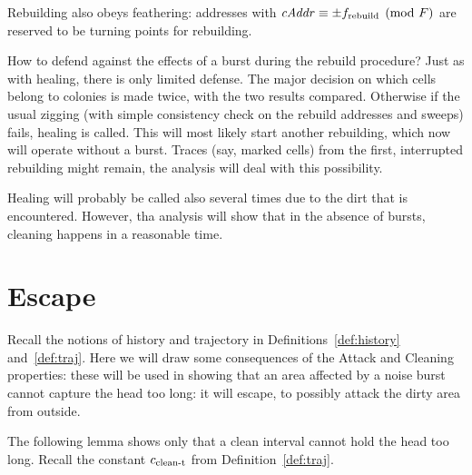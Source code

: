 \documentclass[12pt]{memoir}
\newcommand{\fld}[1]{\ensuremath{\textit{#1\/}}}
\newcommand{\tRebuild}{f_{\mathrm{rebuild}}}
\newcommand{\F}{F}
\newcommand{\cAddr}{\fld{cAddr}}
\newcommand{\cns}[1]{c_{\textrm{\upshape #1}}}
\newcommand{\cCleanT}{\cns{clean-t}}
\begin{document}
Rebuilding also obeys feathering: addresses with \( \cAddr\equiv\pm \tRebuild\pmod{\F} \)
are reserved to be turning points for rebuilding.

How to defend against the effects of a burst during the rebuild procedure?
Just as with healing, there is only limited defense.
The major decision on which cells belong to colonies is made twice, with the
two results compared.
Otherwise if the usual zigging (with simple consistency check on the rebuild addresses
and sweeps) fails, healing is called.
This will most likely start another rebuilding, which now will operate without a burst.
Traces (say, marked cells) from the first, interrupted rebuilding might remain,
the analysis will deal with this possibility.

Healing will probably be called also several times due to the dirt that is encountered.
However, tha analysis will show that in the absence of bursts, cleaning happens
in a reasonable time.


\section{Escape}

Recall the notions of history and trajectory in Definitions~\ref{def:history} 
and~\ref{def:traj}.
Here we will draw some consequences of the Attack and Cleaning properties:
these will be used in showing that an area affected by a noise burst cannot
capture the head too long: it will escape, to possibly attack the dirty area
from outside.

The following lemma shows only that a clean interval cannot hold the head 
too long.
Recall the constant \( \cCleanT \) from Definition~\ref{def:traj}.
\end{document}
